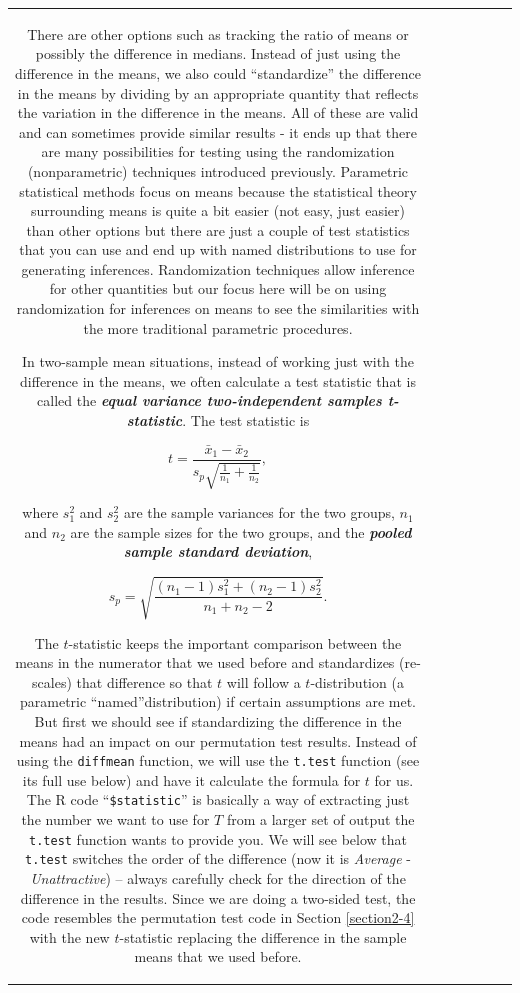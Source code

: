 \documentclass[]{book}
\theoremstyle{definition}
\theoremstyle{definition}
\theoremstyle{remark}
\begin{document}
\begin{longtable}[]{@{}ccccccc@{}}
\begin{minipage}[b]{0.10\columnwidth}
There are other options such as tracking the ratio of means or possibly
the difference in medians. Instead of just using the difference in the
means, we also could ``standardize'' the difference in the means by
dividing by an appropriate quantity that reflects the variation in the
difference in the means. All of these are valid and can sometimes
provide similar results - it ends up that there are many possibilities
for testing using the randomization (nonparametric) techniques
introduced previously. Parametric statistical methods focus on means
because the statistical theory surrounding means is quite a bit easier
(not easy, just easier) than other options but there are just a couple
of test statistics that you can use and end up with named distributions
to use for generating inferences. Randomization techniques allow
inference for other quantities but our focus here will be on using
randomization for inferences on means to see the similarities with the
more traditional parametric procedures.

In two-sample mean situations, instead of working just with the
difference in the means, we often calculate a test statistic that is
called the \textbf{\emph{equal variance two-independent samples
t-statistic}}. The test statistic is

\[t = \frac{\bar{x}_1 - \bar{x}_2}{s_p\sqrt{\frac{1}{n_1}+\frac{1}{n_2}}},\]

where \(s_1^2\) and \(s_2^2\) are the sample variances for the two
groups, \(n_1\) and \(n_2\) are the sample sizes for the two groups, and
the \textbf{\emph{pooled sample standard deviation}},

\[s_p = \sqrt{\frac{(n_1-1)s_1^2 + (n_2-1)s_2^2}{n_1+n_2-2}}.\]

The \(t\)-statistic keeps the important comparison between the means in
the numerator that we used before and standardizes (re-scales) that
difference so that \(t\) will follow a \(t\)-distribution (a parametric
``named''distribution) if certain assumptions are met. But first we
should see if standardizing the difference in the means had an impact on
our permutation test results. Instead of using the \texttt{diffmean}
function, we will use the \texttt{t.test} function (see its full use
below) and have it calculate the formula for \(t\) for us. The R code
``\texttt{\$statistic}'' is basically a way of extracting just the
number we want to use for \(T\) from a larger set of output the
\texttt{t.test} function wants to provide you. We will see below that
\texttt{t.test} switches the order of the difference (now it is
\emph{Average} - \emph{Unattractive}) -- always carefully check for the
direction of the difference in the results. Since we are doing a
two-sided test, the code resembles the permutation test code in Section
\ref{section2-4} with the new \(t\)-statistic replacing the difference
in the sample means that we used before.


\end{minipage}
\end{longtable}
\end{document}
